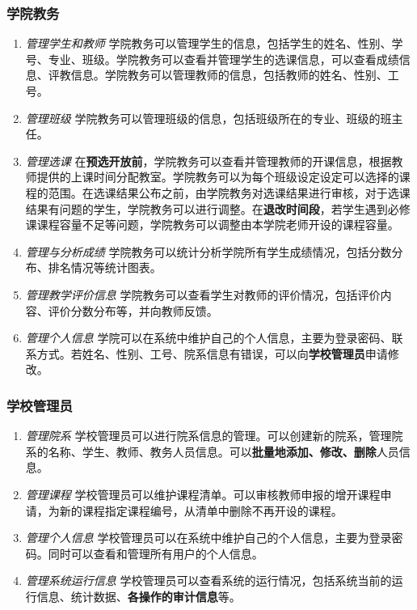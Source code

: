 \subsubsection{学院教务}
\begin{enumerate}
    \item \textit{管理学生和教师} \quad 学院教务可以管理学生的信息，包括学生的姓名、性别、学号、专业、班级。学院教务可以查看并管理学生的选课信息，可以查看成绩信息、评教信息。学院教务可以管理教师的信息，包括教师的姓名、性别、工号。
    \item \textit{管理班级} \quad 学院教务可以管理班级的信息，包括班级所在的专业、班级的班主任。
    \item \textit{管理选课} \quad 在\textbf{预选开放前}，学院教务可以查看并管理教师的开课信息，根据教师提供的上课时间分配教室。学院教务可以为每个班级设定设定可以选择的课程的范围。在选课结果公布之前，由学院教务对选课结果进行审核，对于选课结果有问题的学生，学院教务可以进行调整。在\textbf{退改时间段}，若学生遇到必修课课程容量不足等问题，学院教务可以调整由本学院老师开设的课程容量。
    \item \textit{管理与分析成绩} \quad 学院教务可以统计分析学院所有学生成绩情况，包括分数分布、排名情况等统计图表。
    \item \textit{管理教学评价信息} \quad 学院教务可以查看学生对教师的评价情况，包括评价内容、评价分数分布等，并向教师反馈。
    \item \textit{管理个人信息} \quad 学院可以在系统中维护自己的个人信息，主要为登录密码、联系方式。若姓名、性别、工号、院系信息有错误，可以向\textbf{学校管理员}申请修改。
\end{enumerate}

\subsubsection{学校管理员}
\begin{enumerate}
    \item \textit{管理院系} \quad 学校管理员可以进行院系信息的管理。可以创建新的院系，管理院系的名称、学生、教师、教务人员信息。可以\textbf{批量地添加、修改、删除}人员信息。
    \item \textit{管理课程} \quad 学校管理员可以维护课程清单。可以审核教师申报的增开课程申请，为新的课程指定课程编号，从清单中删除不再开设的课程。
    \item \textit{管理个人信息} \quad 学校管理员可以在系统中维护自己的个人信息，主要为登录密码。同时可以查看和管理所有用户的个人信息。
    \item \textit{管理系统运行信息} \quad 学校管理员可以查看系统的运行情况，包括系统当前的运行信息、统计数据、\textbf{各操作的审计信息}等。
\end{enumerate}

